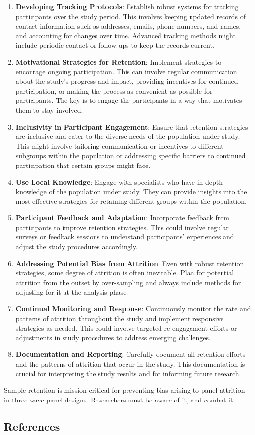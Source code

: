 \documentclass[
  singlecolumn,
  9pt]{article}
\begin{document}
\begin{enumerate}
\def\labelenumi{\arabic{enumi}.}
\item
  \textbf{Developing Tracking Protocols}: Establish robust systems for
  tracking participants over the study period. This involves keeping
  updated records of contact information such as addresses, emails,
  phone numbers, and names, and accounting for changes over time.
  Advanced tracking methods might include periodic contact or follow-ups
  to keep the records current.
\item
  \textbf{Motivational Strategies for Retention}: Implement strategies
  to encourage ongoing participation. This can involve regular
  communication about the study's progress and impact, providing
  incentives for continued participation, or making the process as
  convenient as possible for participants. The key is to engage the
  participants in a way that motivates them to stay involved.
\item
  \textbf{Inclusivity in Participant Engagement}: Ensure that retention
  strategies are inclusive and cater to the diverse needs of the
  population under study. This might involve tailoring communication or
  incentives to different subgroups within the population or addressing
  specific barriers to continued participation that certain groups might
  face.
\item
  \textbf{Use Local Knowledge}: Engage with specialists who have
  in-depth knowledge of the population under study. They can provide
  insights into the most effective strategies for retaining different
  groups within the population.
\item
  \textbf{Participant Feedback and Adaptation}: Incorporate feedback
  from participants to improve retention strategies. This could involve
  regular surveys or feedback sessions to understand participants'
  experiences and adjust the study procedures accordingly.
\item
  \textbf{Addressing Potential Bias from Attrition}: Even with robust
  retention strategies, some degree of attrition is often inevitable.
  Plan for potential attrition from the outset by over-sampling and
  always include methods for adjusting for it at the analysis phase.
\item
  \textbf{Continual Monitoring and Response}: Continuously monitor the
  rate and patterns of attrition throughout the study and implement
  responsive strategies as needed. This could involve targeted
  re-engagement efforts or adjustments in study procedures to address
  emerging challenges.
\item
  \textbf{Documentation and Reporting}: Carefully document all retention
  efforts and the patterns of attrition that occur in the study. This
  documentation is crucial for interpreting the study results and for
  informing future research.
\end{enumerate}

Sample retention is mission-critical for preventing bias arising to
panel attrition in three-wave panel designs. Researchers must be aware
of it, and combat it.

\subsection{References}\label{references-2}
\end{document}

